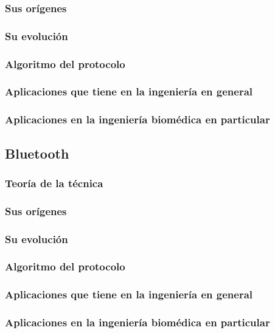\documentclass[conference]{IEEEtran}
\begin{document}
  \subsubsection{Sus orígenes}
  \subsubsection{Su evolución}
  \subsubsection{Algoritmo del protocolo}
  \subsubsection{Aplicaciones que tiene en la ingeniería en general}
  \subsubsection{Aplicaciones en la ingeniería biomédica en particular}

\subsection{Bluetooth}
  \subsubsection{Teoría de la técnica}
  \subsubsection{Sus orígenes}
  \subsubsection{Su evolución}
  \subsubsection{Algoritmo del protocolo}
  \subsubsection{Aplicaciones que tiene en la ingeniería en general}
  \subsubsection{Aplicaciones en la ingeniería biomédica en particular}
\end{document}
